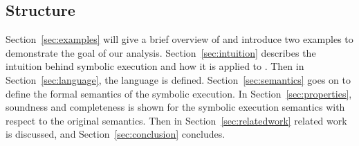 \subsection{Structure}
Section~\ref{sec:examples} will give a brief overview of \TOPHAT and introduce two examples to demonstrate the goal of our analysis.
Section~\ref{sec:intuition} describes the intuition behind symbolic execution and how it is applied to \TOPHAT.
Then in Section~\ref{sec:language}, the \TOPHAT language is defined.
Section~\ref{sec:semantics} goes on to define the formal semantics of the symbolic execution.
In Section~\ref{sec:properties}, soundness and completeness is shown for the symbolic execution semantics with respect to the original \TOPHAT semantics.
Then in Section~\ref{sec:relatedwork} related work is discussed, and Section~\ref{sec:conclusion} concludes.
